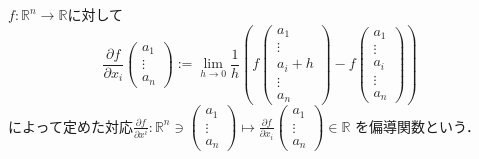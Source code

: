 \documentclass[uplatex, dvipdfmx]{jsreport}
\begin{document}
\begin{definition}[偏微分]$f:\mathbb{R}^n\to\mathbb{R}$に対して
    \[ \frac{\partial f}{\partial x_i} \begin{pmatrix}a_1\\\vdots\\a_n\end{pmatrix}:=\lim_{h\to 0}\frac{1}{h}\left( f\begin{pmatrix}a_1\\\vdots\\a_i+h\\\vdots\\a_n\end{pmatrix}-f\begin{pmatrix}a_1\\\vdots\\a_i\\\vdots\\a_n\end{pmatrix} \right) \]
    によって定めた対応$\frac{\partial f}{\partial x^i}:\mathbb{R}^n\ni\begin{pmatrix}a_1\\\vdots\\a_n\end{pmatrix}\mapsto \frac{\partial f}{\partial x_i}\begin{pmatrix}a_1\\\vdots\\a_n\end{pmatrix}\in\mathbb{R}$
    を偏導関数という．
\end{definition}
\end{document}

